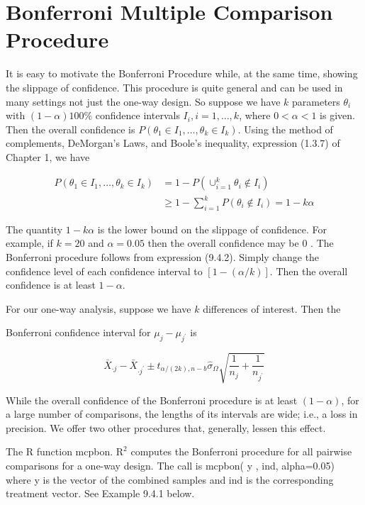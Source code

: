 \section*{Bonferroni Multiple Comparison Procedure}
It is easy to motivate the Bonferroni Procedure while, at the same time, showing the slippage of confidence. This procedure is quite general and can be used in many settings not just the one-way design. So suppose we have $k$ parameters $\theta_{i}$ with $(1-\alpha) 100 \%$ confidence intervals $I_{i}, i=1, \ldots, k$, where $0<\alpha<1$ is given. Then the overall confidence is $P\left(\theta_{1} \in I_{1}, \ldots, \theta_{k} \in I_{k}\right)$. Using the method of complements, DeMorgan's Laws, and Boole's inequality, expression (1.3.7) of Chapter 1, we have


\begin{align*}
P\left(\theta_{1} \in I_{1}, \ldots, \theta_{k} \in I_{k}\right) & =1-P\left(\cup_{i=1}^{k} \theta_{i} \notin I_{i}\right) \\
& \geq 1-\sum_{i=1}^{k} P\left(\theta_{i} \notin I_{i}\right)=1-k \alpha \tag{9.4.2}
\end{align*}


The quantity $1-k \alpha$ is the lower bound on the slippage of confidence. For example, if $k=20$ and $\alpha=0.05$ then the overall confidence may be 0 . The Bonferroni procedure follows from expression (9.4.2). Simply change the confidence level of each confidence interval to $[1-(\alpha / k)]$. Then the overall confidence is at least $1-\alpha$.

For our one-way analysis, suppose we have $k$ differences of interest. Then the

Bonferroni confidence interval for $\mu_{j}-\mu_{j^{\prime}}$ is


\begin{equation*}
\bar{X}_{\cdot j}-\bar{X}_{\cdot j^{\prime}} \pm t_{\alpha /(2 k), n-b} \hat{\sigma}_{\Omega} \sqrt{\frac{1}{n_{j}}+\frac{1}{n_{j^{\prime}}}} \tag{9.4.3}
\end{equation*}


While the overall confidence of the Bonferroni procedure is at least $(1-\alpha)$, for a large number of comparisons, the lengths of its intervals are wide; i.e., a loss in precision. We offer two other procedures that, generally, lessen this effect.

The R function mcpbon. $\mathrm{R}^{2}$ computes the Bonferroni procedure for all pairwise comparisons for a one-way design. The call is mcpbon( y , ind, alpha=0.05) where y is the vector of the combined samples and ind is the corresponding treatment vector. See Example 9.4.1 below.

